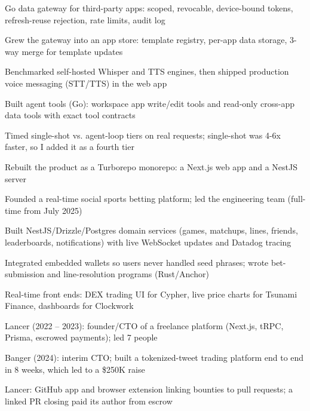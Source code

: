 \documentclass[print]{jack-resume}
\begin{document}
\begin{tightemize}
    \item Go data gateway for third-party apps: scoped, revocable, device-bound tokens, refresh-reuse rejection, rate limits, audit log
    \item Grew the gateway into an app store: template registry, per-app data storage, 3-way merge for template updates
    \item Benchmarked self-hosted Whisper and TTS engines, then shipped production voice messaging (STT/TTS) in the web app
    \item Built agent tools (Go): workspace app write/edit tools and read-only cross-app data tools with exact tool contracts
    \item Timed single-shot vs. agent-loop tiers on real requests; single-shot was 4-6x faster, so I added it as a fourth tier
\end{tightemize}
\sectionsep

\begin{tightemize}
    \item Rebuilt the product as a Turborepo monorepo: a Next.js web app and a NestJS server
    \item Founded a real-time social sports betting platform; led the engineering team (full-time from July 2025)
    \item Built NestJS/Drizzle/Postgres domain services (games, matchups, lines, friends, leaderboards, notifications) with live WebSocket updates and Datadog tracing
    \item Integrated embedded wallets so users never handled seed phrases; wrote bet-submission and line-resolution programs (Rust/Anchor)
\end{tightemize}
\sectionsep

\begin{tightemize}
    \item Real-time front ends: DEX trading UI for Cypher, live price charts for Tsunami Finance, dashboards for Clockwork
    \item Lancer (2022 -- 2023): founder/CTO of a freelance platform (Next.js, tRPC, Prisma, escrowed payments); led 7 people
    \item Banger (2024): interim CTO; built a tokenized-tweet trading platform end to end in 8 weeks, which led to a \$250K raise
    \item Lancer: GitHub app and browser extension linking bounties to pull requests; a linked PR closing paid its author from escrow
\end{tightemize}
\sectionsep
\end{document}
